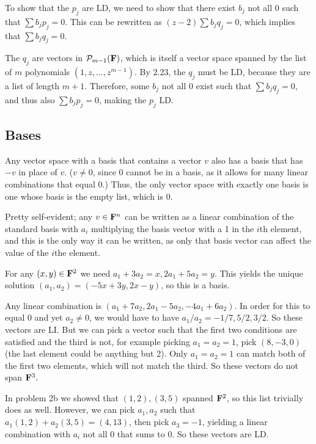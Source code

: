 \documentclass{article}
\begin{document}
To show that the $p_j$ are LD, we need to show that there exist $b_j$ not all 0
such that $\sum b_jp_j = 0$. This can be rewritten as $(z-2) \sum b_jq_j = 0$,
which implies that $\sum b_jq_j = 0$.

The $q_j$ are vectors in $\mathcal{P}_{m-1}(\mathbf{F})$, which is itself a vector
space spanned by the list of $m$ polynomials $(1, z, \ldots, z^{m-1})$. By 2.23,
the $q_j$ must be LD, because they are a list of length $m+1$. Therefore, some
$b_j$ not all 0 exist such that $\sum b_jq_j = 0$, and thus also $\sum b_jp_j =
0$, making the $p_j$ LD.

\subsection{Bases}


Any vector space with a basis that contains a vector $v$ also has a basis that
has $-v$ in place of $v$. ($v \neq 0$, since 0 cannot be in a basis, as it
allows for many linear combinations that equal 0.) Thus, the only vector space
with exactly one basis is one whose basis is the empty list, which is ${0}$.


Pretty self-evident; any $v \in \mathbf{F}^n$ can be written as a linear combination
of the standard basis with $a_i$ multiplying the basis vector with a 1 in the
$i$th element, and this is the only way it can be written, as only that basis
vector can affect the value of the $i$the element.


For any $(x, y) \in \mathbf{F}^2$ we need $a_1 + 3a_2 = x, 2a_1 + 5a_2 = y$. This
yields the unique solution $(a_1, a_2) = (-5x + 3y, 2x - y)$, so this is a
basis.


Any linear combination is $(a_1 + 7a_2, 2a_1 - 5a_2, -4a_1 + 6a_2)$. In order
for this to equal 0 and yet $a_2 \neq 0$, we would have to have $a_1/a_2 = -1/7,
5/2, 3/2$. So these vectors are LI. But we can pick a vector such that the first
two conditions are satisfied and the third is not, for example picking $a_1 =
a_2 = 1$, pick $(8, -3, 0)$ (the last element could be anything but 2). Only
$a_1 = a_2 = 1$ can match both of the first two elements, which will not match
the third. So these vectors do not span $\mathbf{F}^3$.


In problem 2b we showed that $(1,2), (3,5)$ spanned $\mathbf{F}^2$, so this list
trivially does as well. However, we can pick $a_1, a_2$ such that $a_1(1,2) +
a_2(3,5) = (4,13)$, then pick $a_3 = -1$, yielding a linear combination with
$a_i$ not all 0 that sums to 0. So these vectors are LD.
\end{document}
